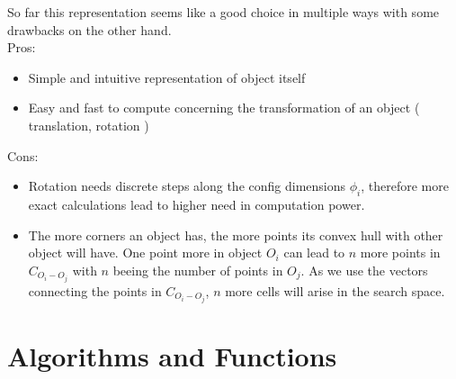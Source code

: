 So far this representation seems like a good choice in multiple ways with some drawbacks on the other hand.\\
Pros:
\begin{itemize}
\item Simple and intuitive representation of object itself
\item Easy and fast to compute concerning the transformation of an object ( translation, rotation )
\end{itemize}
Cons:\\
\begin{itemize}
\item Rotation needs discrete steps along the config dimensions $\phi_i$, therefore more exact calculations lead to higher need in computation power.
\item The more corners an object has, the more points its convex hull with other object will have. One point more in object $O_i$ can lead to $n$ more points in $C_{O_i-O_j}$ with $n$ beeing the number of points in $O_j$. As we use the vectors connecting the points in $C_{O_i-O_j}$, $n$ more cells will arise in the search space.
\end{itemize}

\section{Algorithms and Functions}

